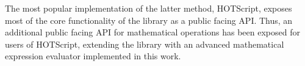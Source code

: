 The most popular implementation of the latter method, HOTScript, exposes most of the core functionality of the library as a public facing API. Thus, an additional public facing API for mathematical operations has been exposed for users of HOTScript, extending the library with an advanced mathematical expression evaluator implemented in this work.
